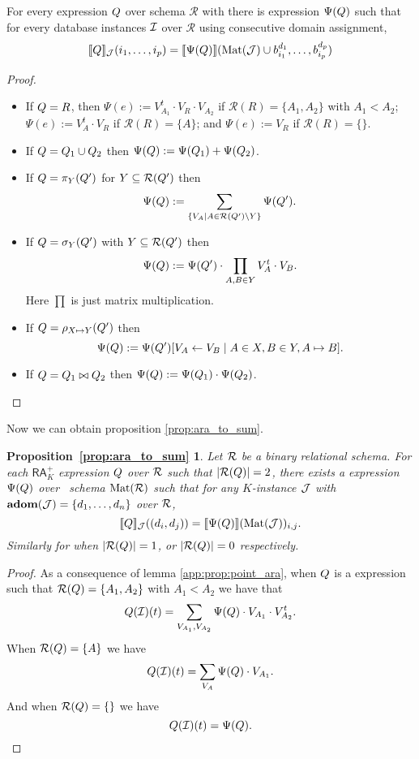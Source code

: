 \begin{lemma}\label{app:prop:point_ara}
For every \rak expression $Q$ over schema $\mathcal{R}$ with there is \langsum expression $\Psi(Q)$ such that for every database instances $\mathcal{I}$ over $\mathcal{R}$ using consecutive domain assignment, 
$$
\llbracket Q \rrbracket_{\mathcal{J}}(i_1,\ldots,i_p)=\llbracket \Psi(Q) \rrbracket(\text{Mat}(\mathcal{J})\cup b_{i_1}^{d_1},\ldots,b_{i_p}^{d_p})
$$
\end{lemma}
\begin{proof}
\begin{itemize}
\item If $Q=R$, then $\Psi(e):=V_{A_1}^t\cdot V_R\cdot V_{A_2}$ if $\mathcal{R}(R)=\{A_1,A_2\}$ with $A_1<A_2$; 
$\Psi(e):=V_A^t\cdot V_R$ if $\mathcal{R}(R)=\{A\}$; and 
$\Psi(e):=V_R$ if $\mathcal{R}(R)=\{\}$.
\item If $Q=Q_1\cup Q_2$ then
$\Psi(Q):=\Psi(Q_1) + \Psi(Q_2)$.
\item If $Q=\pi_{Y}(Q')$ for $Y\subseteq \mathcal{R}(Q')$ then
$$
\Psi(Q):=\sum_{\{V_A\mid A\in \mathcal{R}(Q')\setminus Y\}}\Psi(Q').
 $$
\item If $Q=\sigma_{Y}(Q')$ with $Y\subseteq\mathcal{R}(Q')$ then
$$
 \Psi(Q):=\Psi(Q')\cdot\prod_{A,B\in Y} V_{A}^t\cdot V_{B}.
$$
Here $\prod$ is just matrix multiplication.
\item If $Q=\rho_{X\mapsto Y}(Q')$ then
$$\Psi(Q):=\Psi(Q')[V_A\gets V_B\mid A\in X, B\in Y, A\mapsto B].$$
\item If $Q=Q_1\bowtie Q_2$ then
$\Psi(Q):=\Psi(Q_1)\cdot \Psi(Q_2)$.
\end{itemize}
\end{proof}

Now we can obtain proposition \ref{prop:ara_to_sum}.

\newtheorem*{ARATOSUM}{Proposition~\ref{prop:ara_to_sum}}

\begin{ARATOSUM}
  Let $\mathcal{R}$ be a binary relational schema. For each $\mathsf{RA}_{K}^+$  expression $Q$ over $\mathcal{R}$  such that $|\mathcal{R}(Q)| = 2$, there exists a \langsum  expression $\Psi(Q)$ over \lang \ schema $\text{Mat}(\mathcal{R})$ such that for any $K$-instance $\mathcal{J}$ with $\mathbf{adom}(\mathcal{J}) = \{d_1, \ldots, d_n\}$ over $\mathcal{R}$,
	$$
	\llbracket Q \rrbracket_{\mathcal{J}}((d_i, d_j))=\llbracket \Psi(Q) \rrbracket(\text{Mat}(\mathcal{J}))_{i,j}.
	$$
	Similarly for when $|\mathcal{R}(Q)| = 1$, or $|\mathcal{R}(Q)| = 0$ respectively.
\end{ARATOSUM}
\begin{proof}
As a consequence of lemma \ref{app:prop:point_ara}, when $Q$ is a \rak expression 
such that $\mathcal{R}(Q)=\{A_1,A_2\}$ with $A_1<A_2$ we have that 
$$
Q(\mathcal{I})(t)=
\sum_{V_{A_1},V_{A_2}}\Psi(Q)\cdot V_{A_1}\cdot V_{A_2}^t.
$$
When $\mathcal{R}(Q)=\{A\}$ we have
$$
Q(\mathcal{I})(t)=
\sum_{V_{A}}\Psi(Q)\cdot V_{A_1}.
$$
And when $\mathcal{R}(Q)=\{\}$ we have
$$
Q(\mathcal{I})(t)=\Psi(Q).
$$

\end{proof}
 


